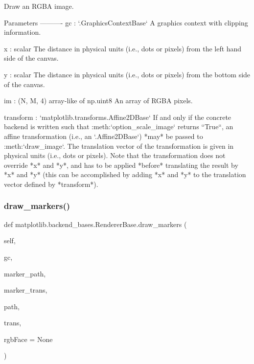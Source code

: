 \begin{DoxyVerb}Draw an RGBA image.

Parameters
----------
gc : `.GraphicsContextBase`
    A graphics context with clipping information.

x : scalar
    The distance in physical units (i.e., dots or pixels) from the left
    hand side of the canvas.

y : scalar
    The distance in physical units (i.e., dots or pixels) from the
    bottom side of the canvas.

im : (N, M, 4) array-like of np.uint8
    An array of RGBA pixels.

transform : `matplotlib.transforms.Affine2DBase`
    If and only if the concrete backend is written such that
    :meth:`option_scale_image` returns ``True``, an affine
    transformation (i.e., an `.Affine2DBase`) *may* be passed to
    :meth:`draw_image`.  The translation vector of the transformation
    is given in physical units (i.e., dots or pixels). Note that
    the transformation does not override *x* and *y*, and has to be
    applied *before* translating the result by *x* and *y* (this can
    be accomplished by adding *x* and *y* to the translation vector
    defined by *transform*).
\end{DoxyVerb}
 \mbox{\label{classmatplotlib_1_1backend__bases_1_1RendererBase_abe29ef2e63593cb93b677369bd939ca0}} 
\subsubsection{\texorpdfstring{draw\+\_\+markers()}{draw\_markers()}}
{\footnotesize\ttfamily def matplotlib.\+backend\+\_\+bases.\+Renderer\+Base.\+draw\+\_\+markers (\begin{DoxyParamCaption}\item[{}]{self,  }\item[{}]{gc,  }\item[{}]{marker\+\_\+path,  }\item[{}]{marker\+\_\+trans,  }\item[{}]{path,  }\item[{}]{trans,  }\item[{}]{rgb\+Face = {\ttfamily None} }\end{DoxyParamCaption})}

